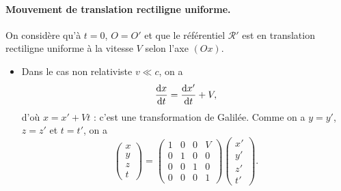             \paragraph{Mouvement de translation rectiligne uniforme.} On considère qu'à $t=0$, $O=O'$ et que le référentiel $\mathcal{R}'$ est en translation rectiligne uniforme à la vitesse $V$ selon l'axe $(Ox)$. \begin{itemize}
                \item Dans le cas non relativiste $v\ll c$, on a 
                \begin{equation*}
                    \frac{\mathrm{d} x}{\mathrm{d} t}=\frac{\mathrm{d} x'}{\mathrm{d} t}+V,
                \end{equation*}
                d'où $x=x'+Vt$ : c'est une transformation de Galilée. Comme on a $y=y'$, $z=z'$ et $t=t'$, on a 
                \begin{equation*}
                    \begin{pmatrix}
                        x\\y\\z\\t
                    \end{pmatrix}=\begin{pmatrix}
                        1&0&0&V\\0&1&0&0\\0&0&1&0\\0&0&0&1
                    \end{pmatrix}\begin{pmatrix}
                        x'\\y'\\z'\\t'
                    \end{pmatrix}.
                \end{equation*}


\end{itemize}
